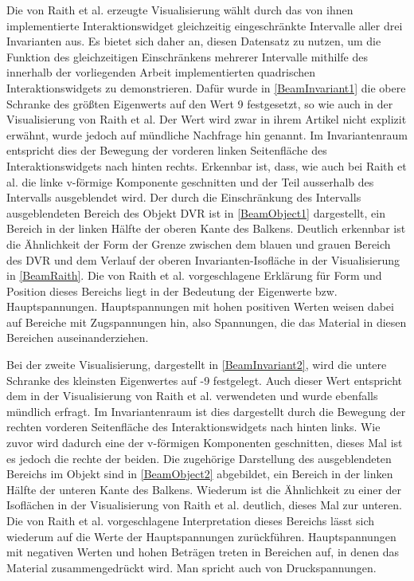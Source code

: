 \documentclass[a4paper,fontsize=12pt,toc=bib,halfparskip,ngerman]{scrartcl}
\begin{document}
Die von Raith et al. erzeugte Visualisierung w\"ahlt durch das von ihnen implementierte Interaktionswidget gleichzeitig eingeschr\"ankte Intervalle aller drei Invarianten aus. Es bietet sich daher an, diesen Datensatz zu nutzen, um die Funktion des gleichzeitigen Einschr\"ankens mehrerer Intervalle mithilfe des innerhalb der vorliegenden Arbeit implementierten quadrischen Interaktionswidgets zu demonstrieren. Daf\"ur wurde in \cref{BeamInvariant1} die obere Schranke des gr\"o{\ss}ten Eigenwerts auf den Wert 9 festgesetzt, so wie auch in der Visualisierung von Raith et al. Der Wert wird zwar in ihrem Artikel nicht explizit erw\"ahnt, wurde jedoch auf m\"undliche Nachfrage hin genannt. Im Invariantenraum entspricht dies der Bewegung der vorderen linken Seitenfl\"ache des Interaktionswidgets nach hinten rechts. Erkennbar ist, dass, wie auch bei Raith et al. die linke v-f\"ormige Komponente geschnitten und der Teil ausserhalb des Intervalls ausgeblendet wird. Der durch die Einschr\"ankung des Intervalls ausgeblendeten Bereich des Objekt DVR ist in \cref{BeamObject1} dargestellt, ein Bereich in der linken H\"alfte der oberen Kante des Balkens. Deutlich erkennbar ist die \"Ahnlichkeit der Form der Grenze zwischen dem blauen und grauen Bereich des DVR und dem Verlauf der oberen Invarianten-Isofl\"ache in der Visualisierung in \cref{BeamRaith}. Die von Raith et al. vorgeschlagene Erkl\"arung f\"ur Form und Position dieses Bereichs liegt in der Bedeutung der Eigenwerte bzw. Hauptspannungen. Hauptspannungen mit hohen positiven Werten weisen dabei auf Bereiche mit Zugspannungen hin, also Spannungen, die das Material in diesen Bereichen auseinanderziehen.

Bei der zweite Visualisierung, dargestellt in \cref{BeamInvariant2}, wird die untere Schranke des kleinsten Eigenwertes auf -9 festgelegt. Auch dieser Wert entspricht dem in der Visualisierung von Raith et al. verwendeten und wurde ebenfalls m\"undlich erfragt. Im Invariantenraum ist dies dargestellt durch die Bewegung der rechten vorderen Seitenfl\"ache des Interaktionswidgets nach hinten links. Wie zuvor wird dadurch eine der v-f\"ormigen Komponenten geschnitten, dieses Mal ist es jedoch die rechte der beiden. Die zugeh\"orige Darstellung des ausgeblendeten Bereichs im Objekt sind in \cref{BeamObject2} abgebildet, ein Bereich in der linken H\"alfte der unteren Kante des Balkens. Wiederum ist die \"Ahnlichkeit zu einer der Isofl\"achen in der Visualisierung von Raith et al. deutlich, dieses Mal zur unteren. Die von Raith et al. vorgeschlagene Interpretation dieses Bereichs l\"asst sich wiederum auf die Werte der Hauptspannungen zur\"uckf\"uhren. Hauptspannungen mit negativen Werten und hohen Betr\"agen treten in Bereichen auf, in denen das Material zusammengedr\"uckt wird. Man spricht auch von Druckspannungen.
\end{document}
